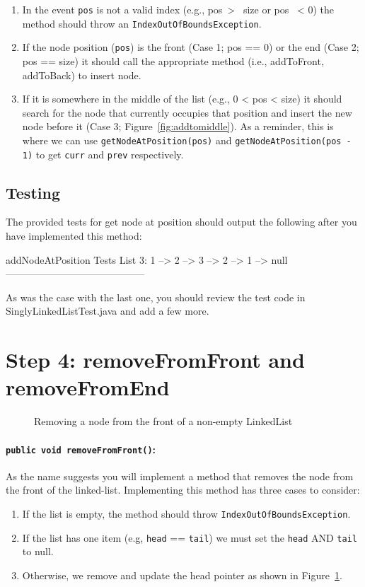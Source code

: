 \begin{enumerate}
\item In the event \lstinline|pos| is not a valid index (e.g., pos\ > \ size or pos \ < 0) the method should throw an \lstinline|IndexOutOfBoundsException|.

\item If the node position (\lstinline|pos|) is the front (Case 1; pos == 0) or the end (Case 2; pos == size) it should call the appropriate method (i.e., addToFront, addToBack) to insert node.\\

\item If it is somewhere in the middle of the list (e.g., 0 < pos < size) it should search for the node that currently occupies that position and insert the new node before it (Case 3; Figure~\ref{fig:addtomiddle}). As a reminder, this is  where we can use \lstinline|getNodeAtPosition(pos)| and \lstinline|getNodeAtPosition(pos - 1)| to get \lstinline|curr| and \lstinline|prev| respectively.
\end{enumerate}

\subsection*{Testing}
The provided tests for get node at position should output the following after you have implemented this method:
\begin{shell}
addNodeAtPosition Tests
List 3: 1 --> 2 --> 3 --> 2 --> 1 --> null
------------------------------------------
\end{shell}
As was the case with the last one, you should review the test code in
SinglyLinkedListTest.java and add a few more.

\newpage

\section{Step 4: removeFromFront and removeFromEnd}

\begin{figure}[H]

\caption{Removing a node from the front of a non-empty LinkedList}
\label{fig:removefromfront}
\end{figure}

\paragraph{\lstinline|public void removeFromFront()|: } As the name suggests
you will implement a method that removes the node from the front of the
linked-list. Implementing this method has three cases to consider: 
\begin{enumerate}
 \item If the list is empty, the method should throw \lstinline|IndexOutOfBoundsException|. 
 \item If the list has one item (e.g, \lstinline|head| == \lstinline|tail|) we must set the \lstinline|head| AND \lstinline|tail| to null.
 \item Otherwise, we remove and update the head pointer as shown in Figure~\ref{fig:removefromfront}.
\end{enumerate}

